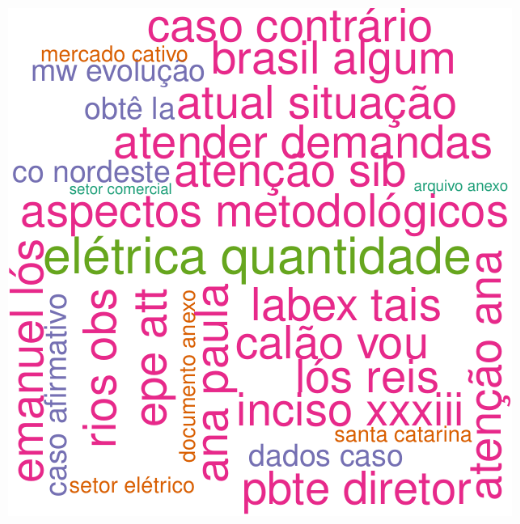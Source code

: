 \documentclass[]{article}
\begin{document}
\includegraphics{markdown_v31_files/figure-latex/wordcloud_bigram_DIR05_semstopwords-1.pdf}
\end{document}
